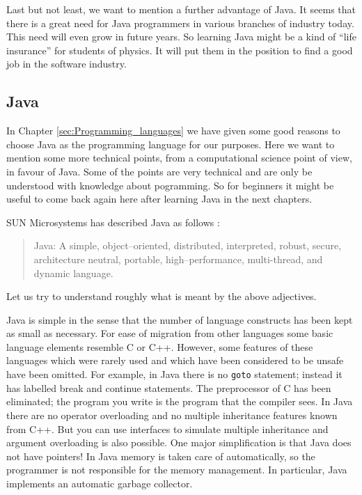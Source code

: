 Last but not least, we want to mention a further advantage of Java. It seems
\cite[]{bigbucks} that there is  a great need for Java programmers in 
various branches of industry today. This need will even grow in future 
years. So learning Java might be a kind of ``life insurance'' for students of 
physics. It will put them in the position to find a good  job in the
software industry.


\subsection{Java}
\label{sec:Java}

In Chapter \ref{sec:Programming_languages} we have given
some good reasons to choose Java as the programming language
for our purposes. Here we want to mention some more technical points, from a 
computational science point of view, in favour of Java. Some of the points
are very technical and are only be understood with knowledge about
pogramming. So for beginners it might be useful to come back again here
after learning Java in the next chapters.

SUN Microsystems has described Java as follows \cite[]{javanutshell}:
\begin{quote}
Java: A simple, object--oriented, distributed, interpreted, robust, secure,
architecture neutral, portable, high--performance, multi-thread, and dynamic 
language.
\end{quote}
Let us try to understand roughly what is meant by the above adjectives.

Java is simple in the sense that the number of language constructs has been 
kept as small as necessary. For ease of migration from other languages some
basic language elements resemble C or C++. However, some features of these 
languages which were rarely used and which have been considered to be unsafe 
have been omitted. For example, in Java there is no \verb|goto|
 statement; instead 
it has labelled break and continue statements. The preprocessor of C has been 
eliminated; the program you write is the program that the compiler sees. In 
Java there are no  operator overloading and no multiple inheritance 
features known from C++. But you can use interfaces to simulate 
multiple inheritance and argument overloading is also possible.
One major simplification is that Java does not have pointers!
In Java memory is taken care of automatically, so the programmer is not responsible 
for the memory management. In particular, Java implements an 
automatic  garbage collector.

